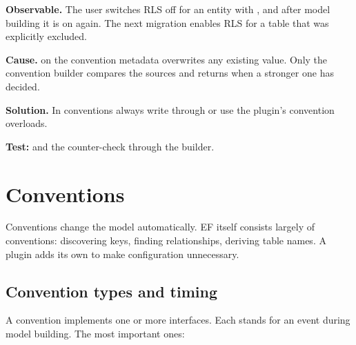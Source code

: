 \begin{failure}
  \textbf{Observable.} The user switches RLS off for an entity with
  ,
  and after model building it is on again. The next migration enables RLS for a table that
  was explicitly excluded.

  \textbf{Cause.}  on the convention metadata overwrites
  any existing value. Only the convention builder compares the sources and returns
   when a stronger one has decided.

  \textbf{Solution.} In conventions always write through
   or use the plugin's convention
  overloads.

  \textbf{Test:}
  and the counter-check through the builder.
\end{failure}

\chapter{Conventions}\label{ch:conventions}

Conventions change the model automatically. EF itself consists largely of conventions:
discovering keys, finding relationships, deriving table names. A plugin adds its own to make
configuration unnecessary.

\section{Convention types and timing}

A convention implements one or more interfaces. Each stands for an event during model
building. The most important ones:

